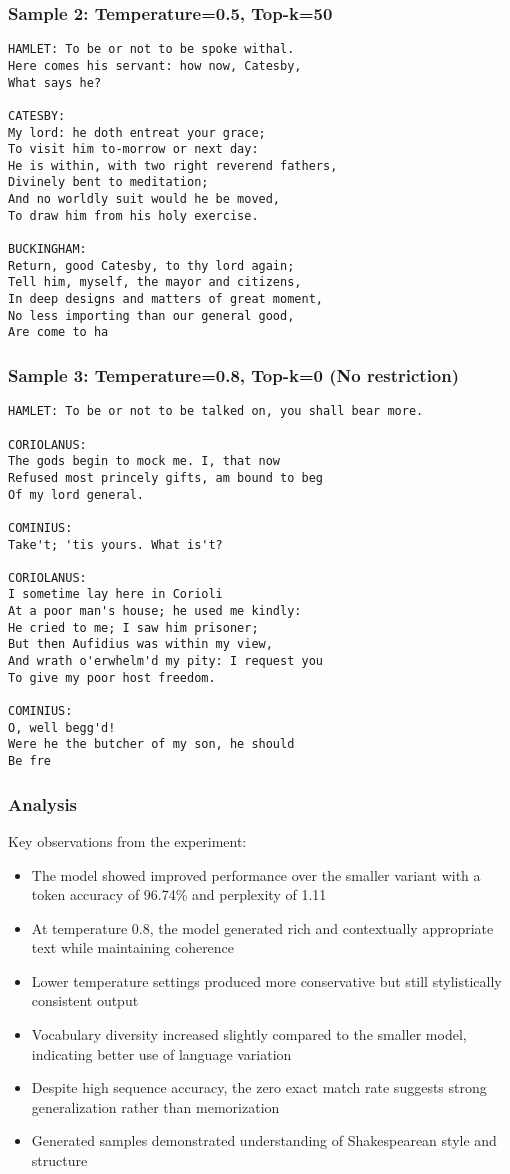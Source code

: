 \subsubsection*{Sample 2: Temperature=0.5, Top-k=50}
\begin{verbatim}
HAMLET: To be or not to be spoke withal.
Here comes his servant: how now, Catesby,
What says he?

CATESBY:
My lord: he doth entreat your grace;
To visit him to-morrow or next day:
He is within, with two right reverend fathers,
Divinely bent to meditation;
And no worldly suit would he be moved,
To draw him from his holy exercise.

BUCKINGHAM:
Return, good Catesby, to thy lord again;
Tell him, myself, the mayor and citizens,
In deep designs and matters of great moment,
No less importing than our general good,
Are come to ha
\end{verbatim}

\subsubsection*{Sample 3: Temperature=0.8, Top-k=0 (No restriction)}
\begin{verbatim}
HAMLET: To be or not to be talked on, you shall bear more.

CORIOLANUS:
The gods begin to mock me. I, that now
Refused most princely gifts, am bound to beg
Of my lord general.

COMINIUS:
Take't; 'tis yours. What is't?

CORIOLANUS:
I sometime lay here in Corioli
At a poor man's house; he used me kindly:
He cried to me; I saw him prisoner;
But then Aufidius was within my view,
And wrath o'erwhelm'd my pity: I request you
To give my poor host freedom.

COMINIUS:
O, well begg'd!
Were he the butcher of my son, he should
Be fre
\end{verbatim}

\subsubsection*{Analysis}
Key observations from the experiment:
\begin{itemize}
    \item The model showed improved performance over the smaller variant with a token accuracy of 96.74\% and perplexity of 1.11
    \item At temperature 0.8, the model generated rich and contextually appropriate text while maintaining coherence
    \item Lower temperature settings produced more conservative but still stylistically consistent output
    \item Vocabulary diversity increased slightly compared to the smaller model, indicating better use of language variation
    \item Despite high sequence accuracy, the zero exact match rate suggests strong generalization rather than memorization
    \item Generated samples demonstrated understanding of Shakespearean style and structure
\end{itemize}



